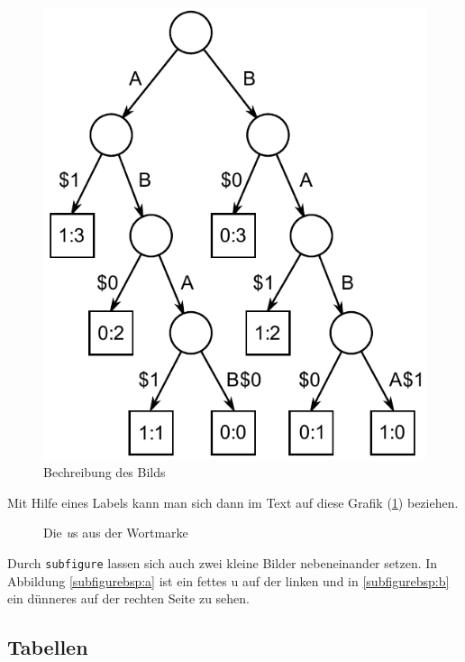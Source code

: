 \begin{figure}[ht]
\centering
\includegraphics[width=.4\textwidth]{images/Suffix_tree_ABAB_BABA}
\caption{\label{anker}Bechreibung des Bilds}
\end{figure}

Mit Hilfe eines Labels kann man sich dann im Text auf diese Grafik (\ref{anker}) beziehen. 

\begin{figure}[ht]
  \centering 
  \hspace{1cm} 
  \caption{Die \emph{u}s aus der Wortmarke}
\end{figure}

Durch \verb|subfigure| lassen sich auch zwei kleine Bilder nebeneinander setzen. In Abbildung \ref{subfigurebsp:a} ist ein fettes u auf der linken und in \ref{subfigurebsp:b} ein dünneres auf der rechten Seite zu sehen.


\subsection{Tabellen}

